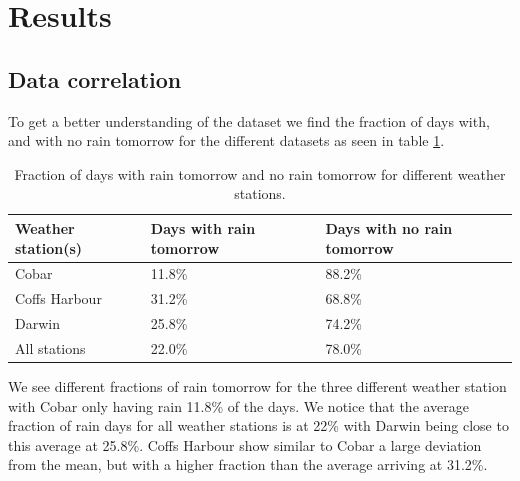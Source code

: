\documentclass[11pt]{article}
\begin{document}
\section{Results}
\subsection{Data correlation} %
\label{sub:Data correlation}

To get a better understanding of the dataset we find the fraction of days with, and with no rain tomorrow for the different datasets as seen in table \ref{tab:frac}.
\begin{table}[H]
    \begin{small}
        \caption{Fraction of days with rain tomorrow and no rain tomorrow for different weather stations.}
        \label{tab:frac}
        \begin{center}
            \begin{tabular}{|l|l|l|}
                \hline
                \textbf{Weather station(s)} & \textbf{Days with rain tomorrow} & \textbf{Days with no rain tomorrow} \\
                \hline
                Cobar                       & 11.8\%                           & 88.2\%                              \\
                \hline
                Coffs Harbour               & 31.2\%                           & 68.8\%                              \\
                \hline
                Darwin                      & 25.8\%                           & 74.2\%                              \\
                \hline
                All stations                & 22.0\%                           & 78.0\%                              \\
                \hline
            \end{tabular}
        \end{center}
    \end{small}
\end{table}
We see different fractions of rain tomorrow for the three different weather station with Cobar only having rain 11.8\% of the days. We notice that the average fraction of rain days for all weather stations is at 22\% with Darwin being close to this average at 25.8\%. Coffs Harbour show similar to Cobar a large deviation from the mean, but with a higher fraction than the average arriving at 31.2\%.
\end{document}
